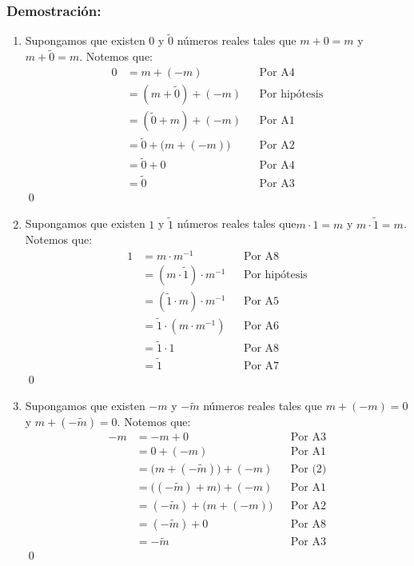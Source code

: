 \documentclass[11pt]{article}
\begin{document}
\subsubsection*{Demostración:}
\begin{enumerate}[label=\alph*), font=\bfseries]
    \item Supongamos que existen 0 y $\tilde{0}$ números reales tales que $m+0 = m$ y $m+\tilde{0} = m$. Notemos que: \begin{align*}
        0 &=m+(-m) && \text{Por A4}\\
        &=\left( m+\tilde{0} \right)+\left(-m\right) && \text{Por hipótesis}\\
        &=\left( \tilde{0}+m \right)+\left(-m\right) && \text{Por A1}\\
        &=\tilde{0} + \bigl( m + \left(-m \right)\bigr) && \text{Por A2}\\
        &=\tilde{0} + 0 && \text{Por A4}\\
        &=\tilde{0} && \text{Por A3}
        \end{align*} \qed

    \item Supongamos que existen $1$ y $\tilde{1}$ números reales tales que$m\cdot 1=m$ y $m\cdot\tilde{1}=m$. Notemos que:
        \begin{align*}
        1 &= m \cdot m^{-1} && \text{Por A8}\\
        &= \left( m \cdot \tilde{1} \right) \cdot m^{-1} && \text{Por hipótesis}\\
        &= \left( \tilde{1} \cdot m \right) \cdot m^{-1} && \text{Por A5}\\
        &= \tilde{1} \cdot \left( m \cdot m^{-1} \right) && \text{Por A6}\\
        &= \tilde{1} \cdot 1 && \text{Por A8}\\
        &= \tilde{1} && \text{Por A7}
        \end{align*} \qed

    \item Supongamos que existen $-m$ y $-\tilde{m}$ números reales tales que $m + \left(-m\right) = 0$ y $m + \left(- \tilde{m}\right) = 0$. Notemos que:
        \begin{align*}
        -m &= -m+0 && \text{Por A3}\\
        &= 0+\left(-m\right) && \text{Por A1}\\
        &= \bigl(m+\left(-\tilde{m} \right)\bigr)+\left(-m\right) && \text{Por (2)}\\
        &= \bigl(\left(-\tilde{m} \right)+m\bigr)+\left(-m\right) && \text{Por A1}\\
        &= \left(-\tilde{m} \right)+\bigl(m+\left(-m\right)\bigr) && \text{Por A2}\\
        &= \left(-\tilde{m} \right)+0 && \text{Por A8}\\
        &= -\tilde{m} && \text{Por A3}
        \end{align*} \qed


\end{enumerate}
\end{document}
